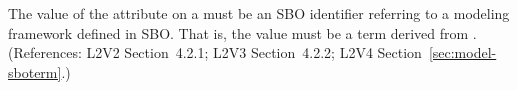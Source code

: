 The value of the  attribute on a \Model must be an SBO
identifier referring to a modeling framework defined in SBO.  That is, the
value must be a term derived from \sboframework.  (References: L2V2
Section~4.2.1; L2V3 Section~4.2.2; L2V4 Section~\ref{sec:model-sboterm}.)
